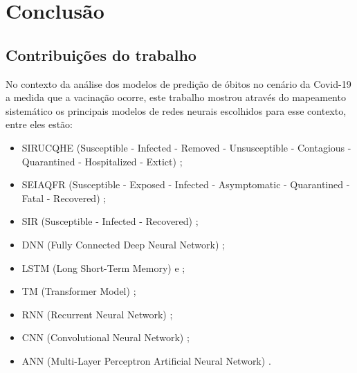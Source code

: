 \chapter{Conclusão}
\label{cap:conclusão}
\section{Contribuições do trabalho}

No contexto da análise dos modelos de predição de óbitos no cenário da Covid-19 a medida que a vacinação ocorre, este trabalho mostrou através do mapeamento sistemático os principais modelos de redes neurais escolhidos para esse contexto, entre eles estão: 
\begin{itemize}
    \item SIRUCQHE (Susceptible - Infected - Removed - Unsusceptible - Contagious - Quarantined - Hospitalized - Extict) \cite{Scarabaggio};
    \item SEIAQFR (Susceptible - Exposed - Infected - Asymptomatic - Quarantined - Fatal - Recovered) \cite{Rakshit};
    \item SIR (Susceptible - Infected - Recovered) \cite{Chinchilla};
    \item DNN (Fully Connected Deep Neural Network) \cite{Alkhammash};
    \item LSTM (Long Short-Term Memory) \cite{Nikita} e \cite{Alkhammash};
    \item TM (Transformer Model) \cite{Alkhammash};
    \item RNN (Recurrent Neural Network) \cite{Nikita};
    \item CNN (Convolutional Neural Network) \cite{Nikita};
    \item ANN (Multi-Layer Perceptron Artificial Neural Network) \cite{DeCarvalho}.
\end{itemize} 


